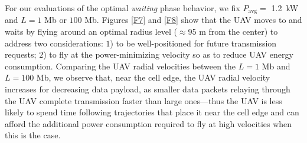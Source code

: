 \documentclass[12pt, draftcls, onecolumn]{IEEEtran}
\theoremstyle{plain}
\theoremstyle{definition}
\theoremstyle{remark}
\begin{document}
For our evaluations of the optimal \emph{waiting} phase behavior, we fix $P_{\mathrm{avg}}=$ \qty[mode=text]{1.2}{\kilo\watt} and $L=1$ Mb or $100$ Mb. Figures \ref{F7} and \ref{F8} show that the UAV moves to and waits by flying around an optimal radius level ($\approx$95 m from the center) to address two considerations: $1$) to be well-positioned for future transmission requests; $2$) to fly at the power-minimizing velocity so as to reduce UAV energy consumption. Comparing the UAV radial velocities between the $L=1$ Mb and $L=100$ Mb, we observe that, near the cell edge, the UAV radial velocity increases for decreasing data payload, as smaller data packets relaying through the UAV complete transmission faster than large ones---thus the UAV is less likely to spend time following trajectories that place it near the cell edge and can afford the additional power consumption required to fly at high velocities when this is the case.
\end{document}
